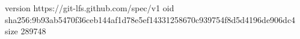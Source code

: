 version https://git-lfs.github.com/spec/v1
oid sha256:9b93ab5470f36ceb144af1d78e5ef14331258670c939754f8d5d4196de906dc4
size 289748
